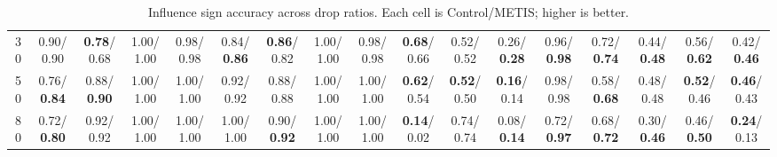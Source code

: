 \begin{table}[t]
{\begin{tabular}{c|cccc|cccc||cccc|cccc}
30 & 0.90/0.90 & \textbf{0.78}/0.68 & 1.00/1.00 & 0.98/0.98 & 0.84/\textbf{0.86} & \textbf{0.86}/0.82 & 1.00/1.00 & 0.98/0.98 & \textbf{0.68}/0.66 & 0.52/0.52 & 0.26/\textbf{0.28} & 0.96/\textbf{0.98} & 0.72/\textbf{0.74} & 0.44/\textbf{0.48} & 0.56/\textbf{0.62} & 0.42/\textbf{0.46} \\
50 & 0.76/\textbf{0.84} & 0.88/\textbf{0.90} & 1.00/1.00 & 1.00/1.00 & 0.92/0.92 & 0.88/0.88 & 1.00/1.00 & 1.00/1.00 & \textbf{0.62}/0.54 & \textbf{0.52}/0.50 & \textbf{0.16}/0.14 & 0.98/0.98 & 0.58/\textbf{0.68} & 0.48/0.48 & \textbf{0.52}/0.46 & \textbf{0.46}/0.43 \\
80 & 0.72/\textbf{0.80} & 0.92/0.92 & 1.00/1.00 & 1.00/1.00 & 1.00/1.00 & 0.90/\textbf{0.92} & 1.00/1.00 & 1.00/1.00 & \textbf{0.14}/0.02 & 0.74/0.74 & 0.08/\textbf{0.14} & 0.72/\textbf{0.97} & 0.68/\textbf{0.72} & 0.30/\textbf{0.46} & 0.46/\textbf{0.50} & \textbf{0.24}/0.13 \\
\bottomrule
\end{tabular}%
}
\caption{Influence sign accuracy across drop ratios. Each cell is Control/METIS; higher is better.}
\label{tab:partition_compare_signacc_ctrl_metis}
\end{table}

